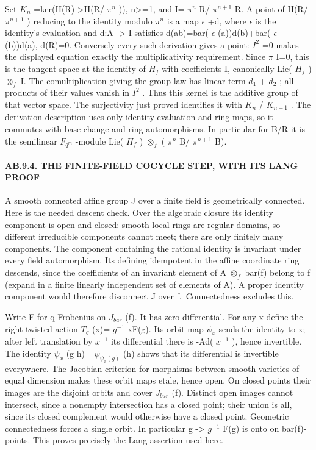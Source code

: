 \documentclass[
  11pt,
]{article}
\begin{document}
Set \(K_{n}\) =ker(H(R)-\textgreater H(R/ \(\pi^n\) )), n\textgreater=1,
and I= \(\pi^n\) R/ \(\pi^{n+1}\) R. A point of H(R/ \(\pi^{n+1}\) )
reducing to the identity modulo \(\pi^n\) is a map \(\epsilon\) +d,
where \(\epsilon\) is the identity's evaluation and d:A -\textgreater{}
I satisfies d(ab)=bar( \(\epsilon\) (a))d(b)+bar( \(\epsilon\) (b))d(a),
d(R)=0. Conversely every such derivation gives a point: \(I^2\) =0 makes
the displayed equation exactly the multiplicativity requirement. Since
\(\pi\) I=0, this is the tangent space at the identity of \(H_{f}\) with
coefficients I, canonically Lie( \(H_{f}\) ) \(\otimes_{f}\) I. The
comultiplication giving the group law has linear term \(d_{1}\) +
\(d_{2}\) ; all products of their values vanish in \(I^2\) . Thus this
kernel is the additive group of that vector space. The surjectivity just
proved identifies it with \(K_{n}\) / \(K_{n+1}\) . The derivation
description uses only identity evaluation and ring maps, so it commutes
with base change and ring automorphisms. In particular for B/R it is the
semilinear \(F_{q^m}\) -module Lie( \(H_{f}\) ) \(\otimes_{f}\) (
\(\pi^n\) B/ \(\pi^{n+1}\) B).

\paragraph{AB.9.4. THE FINITE-FIELD COCYCLE STEP, WITH ITS LANG
PROOF}\label{ab.9.4.-the-finite-field-cocycle-step-with-its-lang-proof}

A smooth connected affine group J over a finite field is geometrically
connected. Here is the needed descent check. Over the algebraic closure
its identity component is open and closed: smooth local rings are
regular domains, so different irreducible components cannot meet; there
are only finitely many components. The component containing the rational
identity is invariant under every field automorphism. Its defining
idempotent in the affine coordinate ring descends, since the
coefficients of an invariant element of A \(\otimes_{f}\) bar(f) belong
to f (expand in a finite linearly independent set of elements of A). A
proper identity component would therefore disconnect J over
f.~Connectedness excludes this.

Write F for q-Frobenius on \(J_{bar}\) (f). It has zero differential.
For any x define the right twisted action \(T_{g}\) (x)= \(g^{-1}\)
xF(g). Its orbit map \(\psi_{x}\) sends the identity to x; after left
translation by \(x^{-1}\) its differential there is -Ad( \(x^{-1}\) ),
hence invertible. The identity \(\psi_{x}\) (g h)=
\(\psi_{\psi_{x}(g)}\) (h) shows that its differential is invertible
everywhere. The Jacobian criterion for morphisms between smooth
varieties of equal dimension makes these orbit maps etale, hence open.
On closed points their images are the disjoint orbits and cover
\(J_{bar}\) (f). Distinct open images cannot intersect, since a nonempty
intersection has a closed point; their union is all, since its closed
complement would otherwise have a closed point. Geometric connectedness
forces a single orbit. In particular g \textbar-\textgreater{}
\(g^{-1}\) F(g) is onto on bar(f)-points. This proves precisely the Lang
assertion used here.
\end{document}

